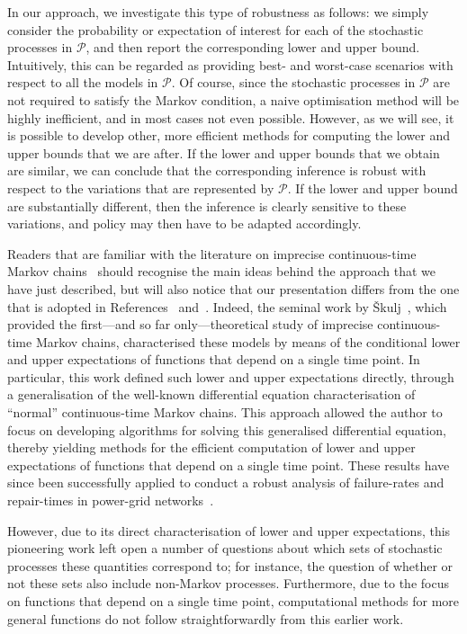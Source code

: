 \documentclass[10pt,a4paper]{paper}
\theoremstyle{definition}
\begin{document}
In our approach, we investigate this type of robustness as follows: we simply consider the probability or expectation of interest for each of the stochastic processes in $\mathcal{P}$, and then report the corresponding lower and upper bound. Intuitively, this can be regarded as providing best- and worst-case scenarios with respect to all the models in $\mathcal{P}$.
Of course, since the stochastic processes in $\mathcal{P}$ are not required to satisfy the Markov condition, a naive optimisation method will be highly inefficient, and in most cases not even possible. However, as we will see, it is possible to develop other, more efficient methods for computing the lower and upper bounds that we are after. If the lower and upper bounds that we obtain are similar, we can conclude that the corresponding inference is robust with respect to the variations that are represented by $\mathcal{P}$. If the lower and upper bound are substantially different, then the inference is clearly sensitive to these variations, and policy may then have to be adapted accordingly. 


Readers that are familiar with the literature on imprecise continuous-time Markov chains~\cite{Skulj:2015cq,troffaes2015using} should recognise the main ideas behind the approach that we have just described, but will also notice that our presentation differs from the one that is adopted in References~\cite{Skulj:2015cq} and~\cite{troffaes2015using}. Indeed, the seminal work by {\v{S}}kulj~\cite{Skulj:2015cq}, which provided the first---and so far only---theoretical study of imprecise continuous-time Markov chains, characterised these models by means of the conditional lower and upper expectations of functions that depend on a single time point. In particular, this work defined such lower and upper expectations directly, through a generalisation of the well-known differential equation characterisation of ``normal'' continuous-time Markov chains. This approach allowed the author to focus on developing algorithms for solving this generalised differential equation, thereby yielding methods for the efficient computation of lower and upper expectations of functions that depend on a single time point. These results have since been successfully applied to conduct a robust analysis of failure-rates and repair-times in power-grid networks~\cite{troffaes2015using}.

However, due to its direct characterisation of lower and upper expectations, this pioneering work left open a number of questions about which sets of stochastic processes these quantities correspond to; for instance, the question of whether or not these sets also include non-Markov processes. Furthermore, due to the focus on functions that depend on a single time point, computational methods for more general functions do not follow straightforwardly from this earlier work.
\end{document}
